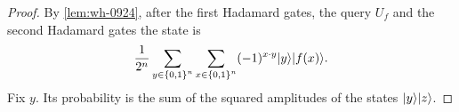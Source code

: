 \begin{proof}
%
%
    By \cref{lem:wh-0924}, after the first Hadamard gates, the query $U_f$ and the second Hadamard
    gates the state is
    \begin{equation}\label{eq:simon-final-0929}
        \frac{1}{2^n} \sum_{y \in \left\lbrace0,1\right\rbrace^n} \sum_{x \in \left\lbrace0,1\right\rbrace^n} (-1)^{x \cdot y} \lvert y \rangle\lvert f(x) \rangle.
    \end{equation}
    Fix $y$. Its probability is the sum of the squared amplitudes of the states $\lvert y \rangle\lvert z \rangle$.


\end{proof}
